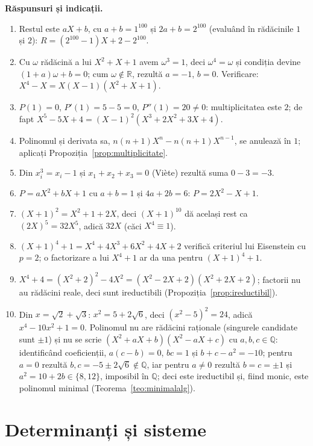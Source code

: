 \medskip\noindent\textbf{Răspunsuri și indicații.}
\begin{enumerate}[label=\textbf{\arabic*.},leftmargin=*]
\item Restul este $aX + b$, cu $a + b = 1^{100}$ și $2a + b = 2^{100}$ (evaluând în rădăcinile $1$ și $2$): $R = (2^{100} - 1)X + 2 - 2^{100}$.
\item Cu $\omega$ rădăcină a lui $X^2+X+1$ avem $\omega^3 = 1$, deci $\omega^4 = \omega$ și condiția devine $(1 + a)\omega + b = 0$; cum $\omega\notin\mathbb{R}$, rezultă $a = -1$, $b = 0$. Verificare: $X^4 - X = X(X - 1)(X^2 + X + 1)$.
\item $P(1) = 0$, $P'(1) = 5 - 5 = 0$, $P''(1) = 20 \ne 0$: multiplicitatea este $2$; de fapt $X^5 - 5X + 4 = (X-1)^2(X^3 + 2X^2 + 3X + 4)$.
\item Polinomul și derivata sa, $n(n+1)X^n - n(n+1)X^{n-1}$, se anulează în $1$; aplicați Propoziția~\ref{prop:multiplicitate}.
\item Din $x_i^3 = x_i - 1$ și $x_1 + x_2 + x_3 = 0$ (Viète) rezultă suma $0 - 3 = -3$.
\item $P = aX^2 + bX + 1$ cu $a + b = 1$ și $4a + 2b = 6$: $P = 2X^2 - X + 1$.
\item $(X+1)^2 = X^2 + 1 + 2X$, deci $(X+1)^{10}$ dă același rest ca $(2X)^5 = 32X^5$, adică $32X$ (căci $X^4 \equiv 1$).
\item $(X+1)^4 + 1 = X^4 + 4X^3 + 6X^2 + 4X + 2$ verifică criteriul lui Eisenstein cu $p = 2$; o factorizare a lui $X^4 + 1$ ar da una pentru $(X+1)^4 + 1$.
\item $X^4 + 4 = (X^2 + 2)^2 - 4X^2 = (X^2 - 2X + 2)(X^2 + 2X + 2)$; factorii nu au rădăcini reale, deci sunt ireductibili (Propoziția~\ref{prop:ireductibil}).
\item Din $x = \sqrt2+\sqrt3$: $x^2 = 5 + 2\sqrt 6$, deci $(x^2 - 5)^2 = 24$, adică $x^4 - 10x^2 + 1 = 0$. Polinomul nu are rădăcini raționale (singurele candidate sunt $\pm1$) și nu se scrie $(X^2+aX+b)(X^2-aX+c)$ cu $a,b,c\in\mathbb{Q}$: identificând coeficienții, $a(c-b)=0$, $bc=1$ și $b+c-a^2=-10$; pentru $a=0$ rezultă $b,c=-5\pm2\sqrt6\notin\mathbb{Q}$, iar pentru $a\neq0$ rezultă $b=c=\pm1$ și $a^2=10+2b\in\{8,12\}$, imposibil în $\mathbb{Q}$; deci este ireductibil și, fiind monic, este polinomul minimal (Teorema~\ref{teo:minimalalg}).
\end{enumerate}

\chapter{Determinanți și sisteme}\label{ch:determinanti}

